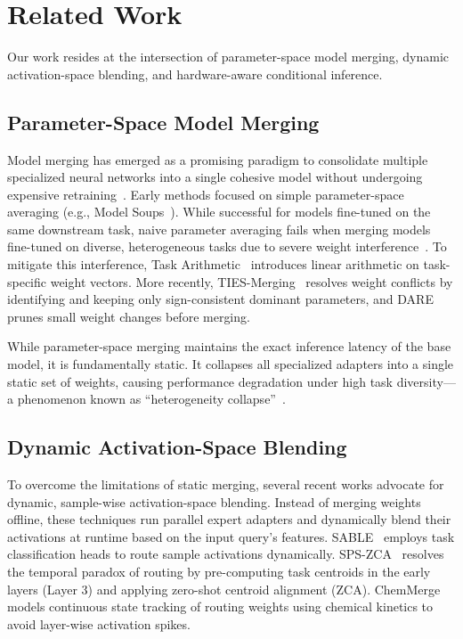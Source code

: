 \section{Related Work}
\label{sec:related_work}

Our work resides at the intersection of parameter-space model merging, dynamic activation-space blending, and hardware-aware conditional inference.

\subsection{Parameter-Space Model Merging}
Model merging has emerged as a promising paradigm to consolidate multiple specialized neural networks into a single cohesive model without undergoing expensive retraining~\citep{wortsman2022model,choshen2022fusing}. Early methods focused on simple parameter-space averaging (e.g., Model Soups~\citep{wortsman2022model}). While successful for models fine-tuned on the same downstream task, naive parameter averaging fails when merging models fine-tuned on diverse, heterogeneous tasks due to severe weight interference~\citep{yadav2023ties}. To mitigate this interference, Task Arithmetic~\citep{ilharco2022editing} introduces linear arithmetic on task-specific weight vectors. More recently, TIES-Merging~\citep{yadav2023ties} resolves weight conflicts by identifying and keeping only sign-consistent dominant parameters, and DARE~\citep{yu2023language} prunes small weight changes before merging. 

While parameter-space merging maintains the exact inference latency of the base model, it is fundamentally static. It collapses all specialized adapters into a single static set of weights, causing performance degradation under high task diversity—a phenomenon known as ``heterogeneity collapse''~\citep{yadav2023ties}. 

\subsection{Dynamic Activation-Space Blending}
To overcome the limitations of static merging, several recent works advocate for dynamic, sample-wise activation-space blending. Instead of merging weights offline, these techniques run parallel expert adapters and dynamically blend their activations at runtime based on the input query's features. SABLE~\citep{sable2025} employs task classification heads to route sample activations dynamically. SPS-ZCA~\citep{spszca2025} resolves the temporal paradox of routing by pre-computing task centroids in the early layers (Layer 3) and applying zero-shot centroid alignment (ZCA). ChemMerge~\citep{chemmerge2026} models continuous state tracking of routing weights using chemical kinetics to avoid layer-wise activation spikes. 

